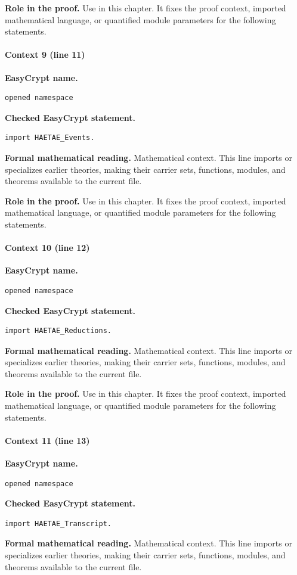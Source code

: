 \noindent\textbf{Role in the proof.}
Use in this chapter. It fixes the proof context, imported mathematical language, or quantified module parameters for the following statements.

\paragraph{Context 9 (line 11)}
\noindent\textbf{EasyCrypt name.}
\begin{lstlisting}[language=EasyCrypt,basicstyle=\ttfamily\scriptsize]
opened namespace
\end{lstlisting}
\noindent\textbf{Checked EasyCrypt statement.}
\begin{lstlisting}[language=EasyCrypt,basicstyle=\ttfamily\scriptsize]
import HAETAE_Events.
\end{lstlisting}
\noindent\textbf{Formal mathematical reading.}
Mathematical context. This line imports or specializes earlier theories, making their carrier sets, functions, modules, and theorems available to the current file.

\noindent\textbf{Role in the proof.}
Use in this chapter. It fixes the proof context, imported mathematical language, or quantified module parameters for the following statements.

\paragraph{Context 10 (line 12)}
\noindent\textbf{EasyCrypt name.}
\begin{lstlisting}[language=EasyCrypt,basicstyle=\ttfamily\scriptsize]
opened namespace
\end{lstlisting}
\noindent\textbf{Checked EasyCrypt statement.}
\begin{lstlisting}[language=EasyCrypt,basicstyle=\ttfamily\scriptsize]
import HAETAE_Reductions.
\end{lstlisting}
\noindent\textbf{Formal mathematical reading.}
Mathematical context. This line imports or specializes earlier theories, making their carrier sets, functions, modules, and theorems available to the current file.

\noindent\textbf{Role in the proof.}
Use in this chapter. It fixes the proof context, imported mathematical language, or quantified module parameters for the following statements.

\paragraph{Context 11 (line 13)}
\noindent\textbf{EasyCrypt name.}
\begin{lstlisting}[language=EasyCrypt,basicstyle=\ttfamily\scriptsize]
opened namespace
\end{lstlisting}
\noindent\textbf{Checked EasyCrypt statement.}
\begin{lstlisting}[language=EasyCrypt,basicstyle=\ttfamily\scriptsize]
import HAETAE_Transcript.
\end{lstlisting}
\noindent\textbf{Formal mathematical reading.}
Mathematical context. This line imports or specializes earlier theories, making their carrier sets, functions, modules, and theorems available to the current file.

